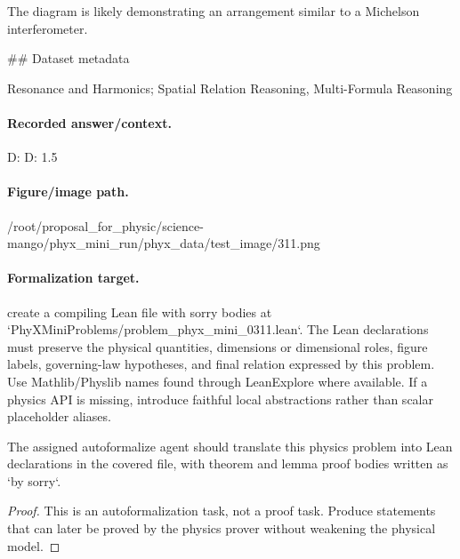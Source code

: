 The diagram is likely demonstrating an arrangement similar to a Michelson interferometer.

\#\# Dataset metadata

Resonance and Harmonics; Spatial Relation Reasoning, Multi-Formula Reasoning

\paragraph{Recorded answer/context.}
D: D: 1.5

\paragraph{Figure/image path.}
/root/proposal\_for\_physic/science-mango/phyx\_mini\_run/phyx\_data/test\_image/311.png

\paragraph{Formalization target.}
create a compiling Lean file with sorry bodies at `PhyXMiniProblems/problem\_phyx\_mini\_0311.lean`. The Lean declarations must preserve the physical quantities, dimensions or dimensional roles, figure labels, governing-law hypotheses, and final relation expressed by this problem.
Use Mathlib/Physlib names found through LeanExplore where available. If a physics API is missing, introduce faithful local abstractions rather than scalar placeholder aliases.

\begin{theorem}
\label{thm:physics:phyx_mini_0311:target}
The assigned autoformalize agent should translate this physics problem into Lean declarations in the covered file, with theorem and lemma proof bodies written as `by sorry`.
\end{theorem}
\begin{proof}
This is an autoformalization task, not a proof task. Produce statements that can later be proved by the physics prover without weakening the physical model.
\end{proof}

